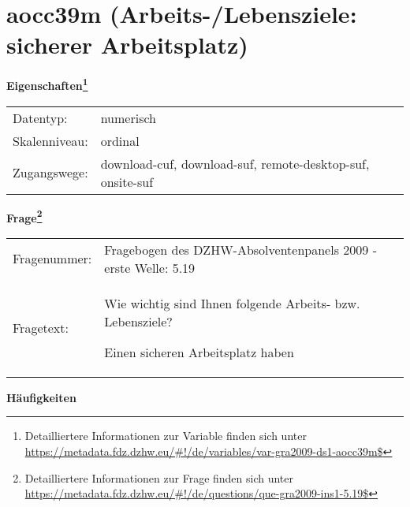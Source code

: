 
    \setcounter{footnote}{0}

    \vspace*{-1.8cm}
	\section{aocc39m (Arbeits-/Lebensziele: sicherer Arbeitsplatz)}
	\label{section:aocc39m}



    \vspace*{0.5cm}
    \noindent\textbf{Eigenschaften\footnote{Detailliertere Informationen zur Variable finden sich unter
		\url{https://metadata.fdz.dzhw.eu/\#!/de/variables/var-gra2009-ds1-aocc39m$}}}\\
	\begin{tabularx}{\hsize}{@{}lX}
	Datentyp: & numerisch \\
	Skalenniveau: & ordinal \\
	Zugangswege: &
	  download-cuf, 
	  download-suf, 
	  remote-desktop-suf, 
	  onsite-suf
 \\
    \end{tabularx}



				\vspace*{0.5cm}
                \noindent\textbf{Frage\footnote{Detailliertere Informationen zur Frage finden sich unter
		              \url{https://metadata.fdz.dzhw.eu/\#!/de/questions/que-gra2009-ins1-5.19$}}}\\
				\begin{tabularx}{\hsize}{@{}lX}
					Fragenummer: &
					  Fragebogen des DZHW-Absolventenpanels 2009 - erste Welle:
					  5.19
 \\
					Fragetext: & Wie wichtig sind Ihnen folgende Arbeits- bzw. Lebensziele?\par  Einen sicheren Arbeitsplatz haben \\
				\end{tabularx}





        		\vspace*{0.5cm}
                \noindent\textbf{Häufigkeiten}

